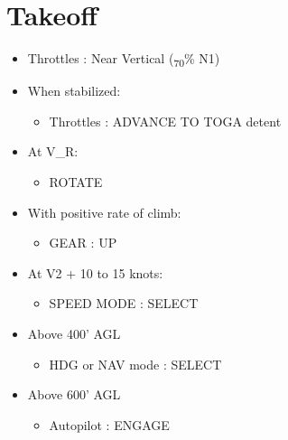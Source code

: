 \section{Takeoff}
\label{takeoff}

\begin{itemize}
\item Throttles : Near Vertical (\textsubscript{70}\% N1)

\item When stabilized:

\begin{itemize}
\item Throttles : ADVANCE TO TOGA detent

\end{itemize}

\item At V\_R:

\begin{itemize}
\item ROTATE

\end{itemize}

\item With positive rate of climb:

\begin{itemize}
\item GEAR : UP

\end{itemize}

\item At V2 + 10 to 15 knots:

\begin{itemize}
\item SPEED MODE : SELECT

\end{itemize}

\item Above 400' AGL

\begin{itemize}
\item HDG or NAV mode : SELECT

\end{itemize}

\item Above 600' AGL

\begin{itemize}
\item Autopilot : ENGAGE

\end{itemize}


\end{itemize}
